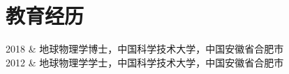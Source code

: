 \section{教育经历}

\begin{EntriesTable}{0.05}{0.02}{0.93}
2018 & 地球物理学博士，中国科学技术大学，中国安徽省合肥市 \\
2012 & 地球物理学学士，中国科学技术大学，中国安徽省合肥市 \\
\end{EntriesTable}
